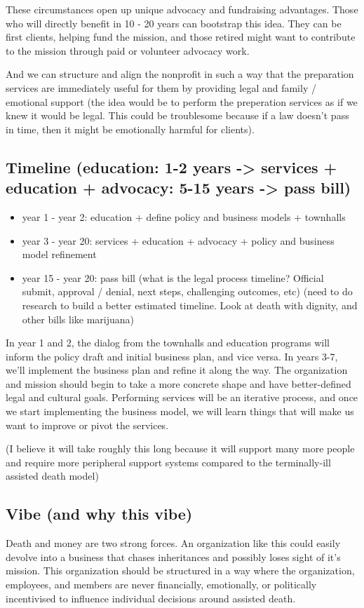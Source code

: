 \documentclass{proposalnsf}
\begin{document}
These circumstances open up unique advocacy and fundraising advantages. Those who will directly benefit in 10 - 20 years can bootstrap this idea. They can be first clients, helping fund the mission, and those retired might want to contribute to the mission through paid or volunteer advocacy work.

And we can structure and align the nonprofit in such a way that the preparation services are immediately useful for them by providing legal and family / emotional support (the idea would be to perform the preperation services as if we knew it would be legal. This could be troublesome because if a law doesn't pass in time, then it might be emotionally harmful for clients).

\subsection{Timeline (education: 1-2 years -> services + education + advocacy: 5-15 years -> pass bill)}
      \begin{itemize}
        \item{year 1 - year 2: education + define policy and business models + townhalls}
        \item{year 3 - year 20: services + education + advocacy + policy and business model refinement}
        \item{year 15 - year 20: pass bill (what is the legal process timeline? Official submit, approval / denial, next steps, challenging outcomes, etc) (need to do research to build a better estimated timeline. Look at death with dignity, and other bills like marijuana)}
      \end{itemize}


In year 1 and 2, the dialog from the townhalls and education programs will inform the policy draft and initial business plan, and vice versa. In years 3-7, we'll implement the business plan and refine it along the way. The organization and mission should begin to take a more concrete shape and have better-defined legal and cultural goals. Performing services will be an iterative process, and once we start implementing the business model, we will learn things that will make us want to improve or pivot the services.

(I believe it will take roughly this long because it will support many more people and require more peripheral support systems compared to the terminally-ill assisted death model)

\subsection{Vibe (and why this vibe)}
Death and money are two strong forces. An organization like this could easily devolve into a business that chases inheritances and possibly loses sight of it's mission. This organization should be structured in a way where the organization, employees, and members are never financially, emotionally, or politically incentivised to influence individual decisions around assisted death.
\end{document}

